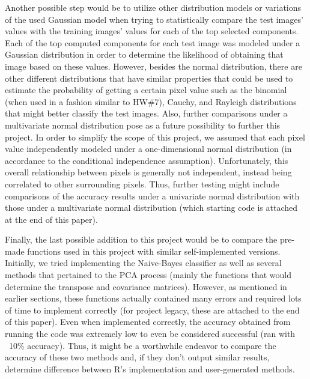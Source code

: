 \documentclass[twocolumn]{article}
\begin{document}
Another possible step would be to utilize other distribution models or variations of the used Gaussian model when trying to statistically compare the test images' values with the training images' values for each of the top selected components. Each of the top computed components for each test image was modeled under a Gaussian distribution in order to determine the likelihood of obtaining that image based on these values. However, besides the normal distribution, there are other different distributions that have similar properties that could be used to estimate the probability of getting a certain pixel value such as the binomial (when used in a fashion similar to HW\#7), Cauchy, and Rayleigh distributions that might better classify the test images. Also, further comparisons under a multivariate normal distribution pose as a future possibility to further this project. In order to simplify the scope of this project, we assumed that each pixel value independently modeled under a one-dimensional normal distribution (in accordance to the conditional independence assumption). Unfortunately, this overall relationship between pixels is generally not independent, instead being correlated to other surrounding pixels. Thus, further testing might include comparisons of the accuracy results under a univariate normal distribution with those under a multivariate normal distribution (which starting code is attached at the end of this paper). 

Finally, the last possible addition to this project would be to compare the pre-made functions used in this project with similar self-implemented versions. Initially, we tried implementing the Naive-Bayes classifier as well as several methods that pertained to the PCA process (mainly the functions that would determine the transpose and covariance matrices). However, as mentioned in earlier sections, these functions actually contained many errors and required lots of time to implement correctly (for project legacy, these are attached to the end of this paper). Even when implemented correctly, the accuracy obtained from running the code was extremely low to even be considered successful (ran with ~10\% accuracy). Thus, it might be a worthwhile endeavor to compare the accuracy of these two methods and, if they don't output similar results, determine difference between R's implementation and user-generated methods.




\end{document}
